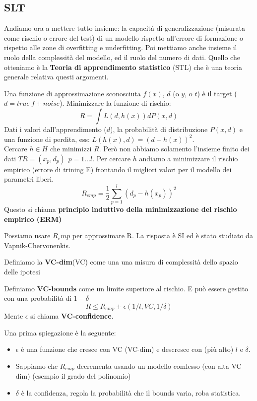\subsection{SLT}
Andiamo ora a mettere tutto insieme: la capacità di generalizzazione (misurata come rischio o errore del test) di un modello rispetto all'errore di
formazione o rispetto alle zone di overfitting e underfitting. Poi mettiamo anche insieme il ruolo della complessità del modello, ed il ruolo del numero di dati.
Quello che otteniamo è la \textbf{Teoria di apprendimento statistico} (STL) che è una teoria generale relativa questi argomenti.
\begin{definition}
    Una funzione di approssimazione sconosciuta $f(x)$, $d$ (o $y$, o $t$) è il target ($d=true \: f+noise$). 
    Minimizzare la funzione di rischio: 
    $$R = \int L(d, h(x))dP(x, d)$$
    Dati i valori dall'apprendimento ($d$), la probabilità di distribuzione $P(x, d)$ e una funzione di perdita, ess: $L(h(x), d) = (d - h(x))^2$.\\
    Cercare $h \in H$ che minimizzi $R$. Però non abbiamo solamento l'insieme finito dei dati $TR = (x_p, d_p) \hspace{5pt} p = 1\dots l$. Per cercare $h$
    andiamo a minimizzare il rischio empirico (errore di trining E) frontando il migliori valori per il modello dei parametri liberi.
    $$R_{emp} = \frac{1}{2}\sum_{p=1}^{l}(d_p - h(x_p))^2$$
    Questo si chiama \textbf{principio induttivo della minimizzazione del rischio empirico (ERM)}
\end{definition}
\hspace{-15pt}Possiamo usare $R_emp$ per approssimare R. La risposta è SI ed è stato studiato da Vapnik-Chervonenkis.
\begin{definition}
    Definiamo la \textbf{VC-dim}(VC) come una una misura di complessità dello spazio delle ipotesi
\end{definition}
\begin{definition}
    Definiamo \textbf{VC-bounds} come un limite superiore al rischio. E può essere gestito con una probabilità di $1-\delta$
    $$R \leq R_{emp} + \epsilon(1/l, VC, 1/\delta)$$
    Mente $\epsilon$ si chiama \textbf{VC-confidence}.
\end{definition}
Una prima spiegazione è la seguente:
\begin{itemize}
    \item $\epsilon$ è una funzione che cresce con VC (VC-dim) e descresce con (più alto) $l$ e $\delta$.
    \item Sappiamo che $R_{emp}$ decrementa usando un modello comlesso (con alta VC-dim) (esempio il grado del polinomio)
    \item $\delta$ è la confidenza, regola la probabilità che il bounds varia, roba statistica.
\end{itemize}
